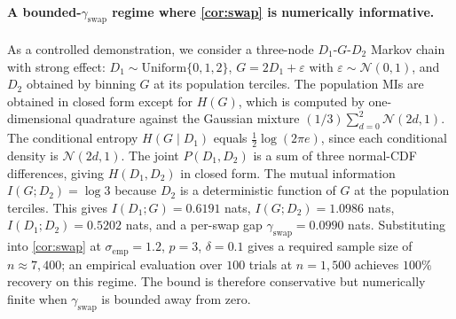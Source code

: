 \paragraph{\texorpdfstring{A bounded-$\gamma_{\mathrm{swap}}$ regime where \cref{cor:swap} is numerically informative.}{A bounded-gamma\_swap regime where Corollary 2 is numerically informative.}} As a
controlled demonstration, we consider a three-node $D_1$-$G$-$D_2$
Markov chain with strong effect: $D_1 \sim \mathrm{Uniform}\{0,1,2\}$,
$G = 2 D_1 + \varepsilon$ with $\varepsilon \sim \mathcal{N}(0, 1)$,
and $D_2$ obtained by binning $G$ at its population terciles. The
population MIs are obtained in closed form except for $H(G)$, which
is computed by one-dimensional quadrature against the Gaussian
mixture $(1/3)\sum_{d=0}^{2} \mathcal{N}(2d, 1)$. The conditional
entropy $H(G \mid D_1)$ equals $\tfrac{1}{2}\log(2\pi e)$, since each
conditional density is $\mathcal{N}(2d, 1)$. The joint $P(D_1, D_2)$
is a sum of three normal-CDF differences, giving $H(D_1, D_2)$ in
closed form. The mutual information $I(G; D_2) = \log 3$ because
$D_2$ is a deterministic function of $G$ at the population
terciles. This gives
$I(D_1; G) = 0.6191$ nats, $I(G; D_2) = 1.0986$ nats,
$I(D_1; D_2) = 0.5202$ nats, and a per-swap gap
$\gamma_{\mathrm{swap}} = 0.0990$ nats. Substituting into
\cref{cor:swap} at $\sigma_{\mathrm{emp}} = 1.2$, $p = 3$,
$\delta = 0.1$ gives a required sample size of $n \approx 7{,}400$;
an empirical evaluation over $100$ trials at $n = 1{,}500$ achieves
$100\%$ recovery on this regime. The bound is therefore conservative
but numerically finite when $\gamma_{\mathrm{swap}}$ is bounded
away from zero.


